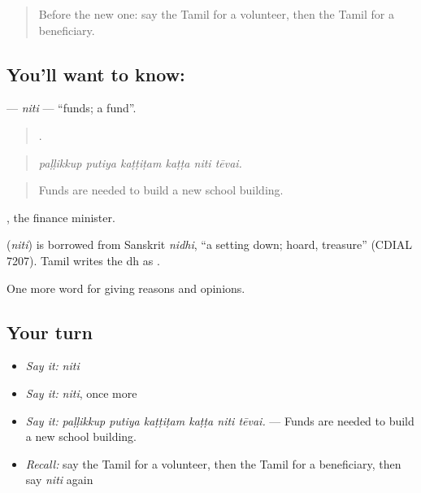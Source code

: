 \label{lesson:TA-C379-niti-funds}



\begin{quote}
Before the new one: say the Tamil for a volunteer, then the Tamil for a beneficiary.
\end{quote}

\subsection*{You'll want to know: }
\textbf{} — \emph{niti} — \textquotedblleft{}funds; a fund\textquotedblright{}.

\begin{quote}
     .
\end{quote}

\begin{quote}
\emph{paḷḷikkup putiya kaṭṭiṭam kaṭṭa niti tēvai.}
\end{quote}

\begin{quote}
Funds are needed to build a new school building.
\end{quote}

, the finance minister.

\begin{cousinweb}
\textbf{} (\emph{niti}) is borrowed from Sanskrit \emph{nidhi}, \textquotedblleft{}a setting down; hoard, treasure\textquotedblright{} (CDIAL 7207). Tamil writes the dh as .
\end{cousinweb}

\begin{grammarlens}[title={What you've built}]
One more word for giving reasons and opinions.
\end{grammarlens}

\subsection*{Your turn}
\begin{itemize}
\raggedright
  \item \emph{Say it:} \emph{niti}
  \item \emph{Say it:} \emph{niti}, once more
  \item \emph{Say it:} \emph{paḷḷikkup putiya kaṭṭiṭam kaṭṭa niti tēvai.} — Funds are needed to build a new school building.
  \item \emph{Recall:} say the Tamil for a volunteer, then the Tamil for a beneficiary, then say \emph{niti} again
\end{itemize}

